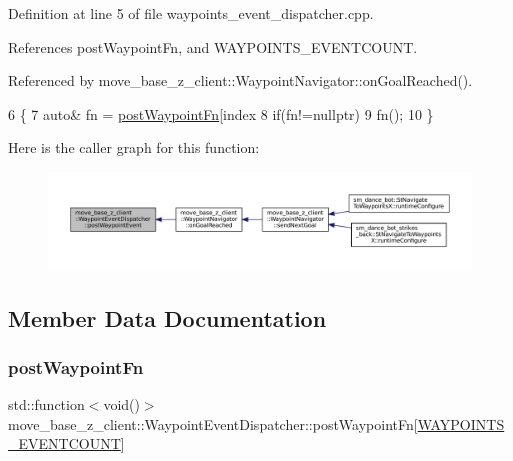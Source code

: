 Definition at line 5 of file waypoints\+\_\+event\+\_\+dispatcher.\+cpp.



References post\+Waypoint\+Fn, and W\+A\+Y\+P\+O\+I\+N\+T\+S\+\_\+\+E\+V\+E\+N\+T\+C\+O\+U\+NT.



Referenced by move\+\_\+base\+\_\+z\+\_\+client\+::\+Waypoint\+Navigator\+::on\+Goal\+Reached().


\begin{DoxyCode}
6 \{
7     \textcolor{keyword}{auto}& fn = \hyperlink{classmove__base__z__client_1_1WaypointEventDispatcher_acc538eb7506c13f7cca2268a1742dadd}{postWaypointFn}[index %
8     \textcolor{keywordflow}{if}(fn!=\textcolor{keyword}{nullptr})
9         fn();
10 \}
\end{DoxyCode}
Here is the caller graph for this function\+:
\nopagebreak
\begin{figure}[H]
\begin{center}
\leavevmode
\includegraphics[width=350pt]{classmove__base__z__client_1_1WaypointEventDispatcher_a7421f1eb8aae15a3ddde7c50bea87648_icgraph}
\end{center}
\end{figure}


\subsection{Member Data Documentation}
\mbox{\label{classmove__base__z__client_1_1WaypointEventDispatcher_acc538eb7506c13f7cca2268a1742dadd}} 
\subsubsection{\texorpdfstring{post\+Waypoint\+Fn}{postWaypointFn}}
{\footnotesize\ttfamily std\+::function$<$void()$>$ move\+\_\+base\+\_\+z\+\_\+client\+::\+Waypoint\+Event\+Dispatcher\+::post\+Waypoint\+Fn\mbox{[}\hyperlink{waypoints__event__dispatcher_8h_add4ce0c5d955be6047a4820c63e7df08}{W\+A\+Y\+P\+O\+I\+N\+T\+S\+\_\+\+E\+V\+E\+N\+T\+C\+O\+U\+NT}\mbox{]}\hspace{0.3cm}{\ttfamily [private]}}



